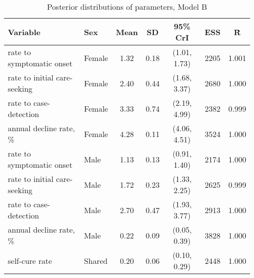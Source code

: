 \begin{table}[h]

\caption{\label{tab:}Posterior distributions of parameters, Model B}
\centering
\begin{tabular}[t]{llccccc}
\toprule
Variable & Sex & Mean & SD & 95\% CrI & ESS & \^{R}\\
\midrule
rate to symptomatic onset & Female & 1.32 & 0.18 & (1.01, 1.73) & 2205 & 1.001\\
rate to initial care-seeking & Female & 2.40 & 0.44 & (1.68, 3.37) & 2680 & 1.000\\
rate to case-detection & Female & 3.33 & 0.74 & (2.19, 4.99) & 2382 & 0.999\\
annual decline rate, \% & Female & 4.28 & 0.11 & (4.06, 4.51) & 3524 & 1.000\\
\addlinespace
rate to symptomatic onset & Male & 1.13 & 0.13 & (0.91, 1.40) & 2174 & 1.000\\
rate to initial care-seeking & Male & 1.72 & 0.23 & (1.33, 2.25) & 2625 & 0.999\\
rate to case-detection & Male & 2.70 & 0.47 & (1.93, 3.77) & 2913 & 1.000\\
annual decline rate, \% & Male & 0.22 & 0.09 & (0.05, 0.39) & 3828 & 1.000\\
\addlinespace
self-cure rate & Shared & 0.20 & 0.06 & (0.10, 0.29) & 2448 & 1.000\\
\bottomrule
\end{tabular}
\end{table}
